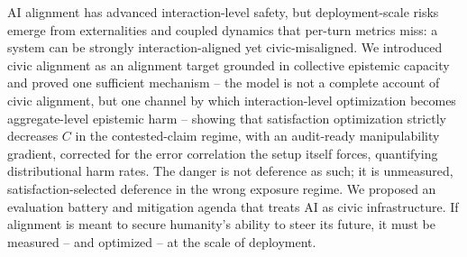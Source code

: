 \documentclass[11pt]{article}
\theoremstyle{definition}
\theoremstyle{remark}
\numberwithin{equation}{section}
\begin{document}
AI alignment has advanced interaction-level safety, but deployment-scale risks emerge from externalities and coupled dynamics that per-turn metrics miss: a system can be strongly interaction-aligned yet civic-misaligned. We introduced civic alignment as an alignment target grounded in collective epistemic capacity and proved one sufficient mechanism -- the model is not a complete account of civic alignment, but one channel by which interaction-level optimization becomes aggregate-level epistemic harm -- showing that satisfaction optimization strictly decreases $C$ in the contested-claim regime, with an audit-ready manipulability gradient, corrected for the error correlation the setup itself forces, quantifying distributional harm rates. The danger is not deference as such; it is unmeasured, satisfaction-selected deference in the wrong exposure regime. We proposed an evaluation battery and mitigation agenda that treats AI as civic infrastructure. If alignment is meant to secure humanity's ability to steer its future, it must be measured -- and optimized -- at the scale of deployment.



\end{document}
